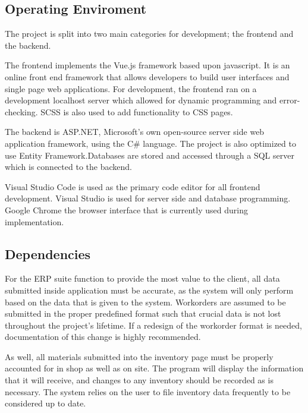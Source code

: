 {{\subsection{Operating Enviroment}
The project is split into two main categories for development; the frontend and the backend. 
\newline
{\setlength{\parindent}{0cm}

The frontend implements the Vue.js framework based upon javascript. It is an online front end framework that allows developers to build user interfaces and single page web applications. For development, the frontend ran on a development localhost server which allowed for dynamic programming and error-checking. SCSS is also used to add functionality to CSS pages.  
\newline
{\setlength{\parindent}{0cm}

The backend is ASP.NET, Microsoft's own open-source server side web application framework, using the C\# language. The project is also optimized to use Entity Framework.Databases are stored and accessed through a SQL server which is connected to the backend.
\newline
{\setlength{\parindent}{0cm}

Visual Studio Code is used as the primary code editor for all frontend development. Visual Studio is used for server side and database programming. Google Chrome the browser interface that is currently used during implementation. 

\subsection{Dependencies}
For the ERP suite function to provide the most value to the client, all data submitted inside application must be accurate, as the system will only perform based on the data that is given to the system. Workorders are assumed to be submitted in the proper predefined format such that crucial data is not lost throughout the project's lifetime. If a redesign of the workorder format is needed, documentation of this change is highly recommended.
\newline
{\setlength{\parindent}{0cm}
 
As well, all materials submitted into the inventory page must be properly accounted for in shop as well as on site. The program will display the information that it will receive, and changes to any inventory should be recorded as is necessary. The system relies on the user to file inventory data frequently to be considered up to date. 
\newline
{\setlength{\parindent}{0cm}

}}}}}}}
